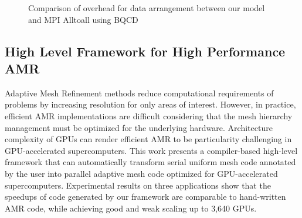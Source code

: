 \documentclass{book}
\begin{document}
\begin{figure}[t]
  \centering

  \hspace{0.1cm}

  \caption{Comparison of overhead for data arrangement between our model and MPI Alltoall using BQCD}
\end{figure}


\subsection{High Level Framework for High Performance AMR}
Adaptive Mesh Refinement methods reduce computational requirements of problems by increasing resolution for only areas of interest. However, in practice, efficient AMR implementations are difficult considering that the mesh hierarchy management must be optimized for the underlying hardware. Architecture complexity of GPUs can render efficient AMR to be particularity challenging in GPU-accelerated supercomputers. This work presents a compiler-based high-level framework that can automatically transform serial uniform mesh code annotated by the user into parallel adaptive mesh code optimized for GPU-accelerated supercomputers. Experimental results on three applications show that the speedups of code generated by our framework are comparable to hand-written AMR code, while achieving good and weak scaling up to 3,640 GPUs.
\end{document}
